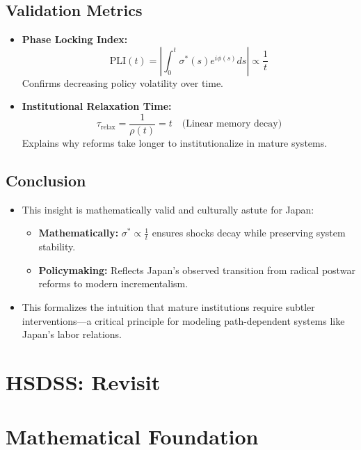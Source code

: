 \documentclass[10pt]{article}
\theoremstyle{definition}
\begin{document}
\subsection{Validation Metrics}

\begin{itemize}
    \item \textbf{Phase Locking Index:}
        \begin{equation}
        \text{PLI}(t) = \left| \int_0^t \sigma^*(s) e^{i\phi(s)} ds \right| \propto \frac{1}{t}
        \end{equation}
        Confirms decreasing policy volatility over time.
    \item \textbf{Institutional Relaxation Time:}
        \begin{equation}
        \tau_{\text{relax}} = \frac{1}{\rho(t)} = t \quad \text{(Linear memory decay)}
        \end{equation}
        Explains why reforms take longer to institutionalize in mature systems.
\end{itemize}

\subsection{Conclusion}

\begin{itemize}
    \item This insight is mathematically valid and culturally astute for Japan:
        \begin{itemize}
            \item \textbf{Mathematically:} $\sigma^* \propto \frac{1}{t}$ ensures shocks decay while preserving system stability.
            \item \textbf{Policymaking:} Reflects Japan’s observed transition from radical postwar reforms to modern incrementalism.
        \end{itemize}
    \item This formalizes the intuition that mature institutions require subtler interventions—a critical principle for modeling path-dependent systems like Japan’s labor relations.
\end{itemize}


\section*{HSDSS: Revisit}
\section{Mathematical Foundation}
\end{document}
